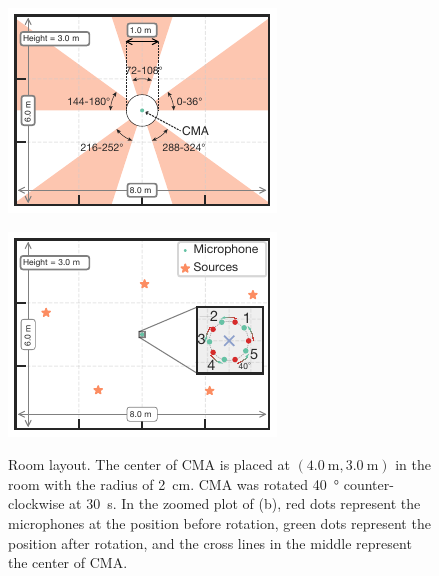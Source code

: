 \documentclass[sip,biber]{now-journal}
\begin{document}
\begin{figure}[t]
  \centering
  \begin{minipage}[t]{.45\linewidth}
    \centering
    \includegraphics[width=\columnwidth]{figures/room_layout_range.pdf}
    \label{fig:layout:range}
  \end{minipage}
  \hspace{.05\linewidth}
  \begin{minipage}[t]{.45\linewidth}
    \centering
    \includegraphics[width=\columnwidth]{figures/room_layout_one.pdf}
    \label{fig:layout:one}
  \end{minipage}
  \caption{%
    Room layout. The center of CMA is placed at $(\SI{4.0}{\metre}, \SI{3.0}{\metre})$ in the room with the radius of \SI{2}{\centi\metre}. CMA was rotated \SI{40}{\degree} counter-clockwise at \SI{30}{\second}.
    In the zoomed plot of (b), red dots represent the microphones at the position before rotation, green dots represent the position after rotation, and the cross lines in the middle represent the center of CMA.
  }%
  \label{fig:layout:exp}
\end{figure}
\end{document}
